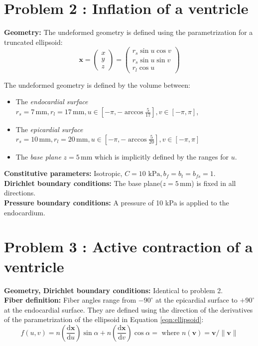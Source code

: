 \documentclass[a4paper,10pt]{article}
\newcommand{\degrees}{^\circ}
\newcommand{\mm}{\,\text{mm}}
\begin{document}
 
\section{Problem 2 : Inflation of a ventricle}

\textbf{Geometry:} 
 The undeformed geometry is defined using the parametrization for a truncated ellipsoid:\\
\begin{equation}
\mathbf{x} = 
 \left( \begin{array}{c} x\\y\\z \end{array}\right) =
  \left(\begin{array}{c}
   r_s \sin u \cos v    \\ 
   r_s \sin u \sin v  \\  
   r_l \cos u   
   \end{array}\right) 
\label{eqn:ellipsoid}
\end{equation}

The undeformed geometry is defined by the volume between:
\begin{itemize}
 \item The \emph{endocardial surface} $r_s=7 \mm, r_l=17\mm, u \in [-\pi, -\arccos \frac{5}{17}], v\in[-\pi,\pi]$, 
 \item The \emph{epicardial surface} $r_s=10 \mm, r_l=20\mm, u \in [-\pi, -\arccos \frac{5}{20}], v\in[-\pi,\pi]$
 \item The \emph{base plane} $z=5\mm$ which is implicitly defined by the ranges for $u$.
\end{itemize}
\textbf{Constitutive parameters:} Isotropic, $C=10 \text{ kPa}, b_f=b_t=b_{fs}=1$.\\
\textbf{Dirichlet boundary conditions:}
 The base plane($z=5\mm$) is fixed in all directions.\\
\textbf{Pressure boundary conditions:}
 A pressure of 10 kPa is applied to the endocardium.

\section{Problem 3 : Active contraction of a ventricle}

\textbf{Geometry, Dirichlet boundary conditions:} 
  Identical to problem 2.\\
\textbf{Fiber definition:} 
  Fiber angles range from $-90\degrees$ at the epicardial surface to $+90\degrees$ at the endocardial surface.
  They are defined using the direction of the derivatives of the parametrization of the ellipsoid in Equation \ref{eqn:ellipsoid}:
\begin{equation}
 f(u,v) =
   n\!\left( \frac{ \text{d}\mathbf{x} }{ \text{d}u } \right) \sin \alpha + 
   n\!\left(\frac{ \text{d}\mathbf{x} }{ \text{d}v } \right)\cos \alpha = 
\text{ where } n(\mathbf{v}) = \mathbf{v}/\|\mathbf{v}\|
\end{equation}
\end{document}
